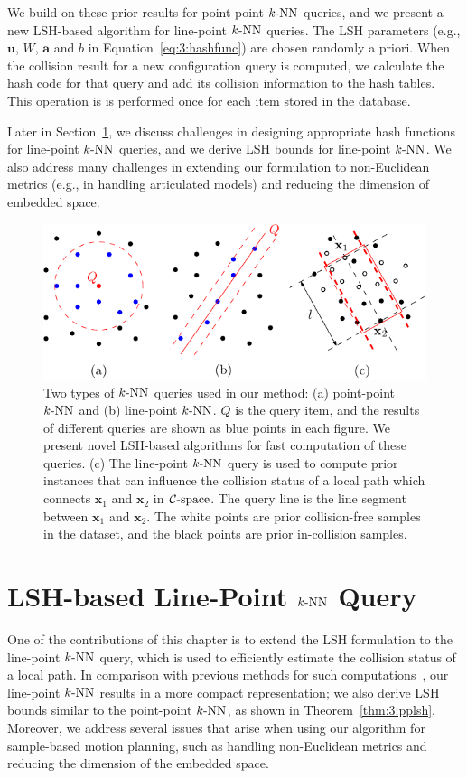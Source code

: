 We build on these prior results for point-point $\knn$ queries, and we present a new LSH-based algorithm for line-point $\knn$ queries. The LSH parameters (e.g., $\mathbf u$, $W$, $\mathbf a$ and $b$ in Equation~\ref{eq:3:hashfunc}) are chosen randomly a priori. When the collision result for a new configuration query is computed, we calculate the hash code for that query and add its collision information to the hash tables. This operation is is performed once for each item stored in the database.

Later in Section~\ref{sec:3:linelsh}, we discuss challenges in designing appropriate hash functions for line-point $\knn$ queries, and we derive LSH bounds for line-point $\knn$. We also address many challenges in extending our formulation to non-Euclidean metrics (e.g., in handling articulated models) and reducing the dimension of embedded space.

\begin{figure}[!h]
  \begin{center}
  \includegraphics[width=0.7\linewidth]{figs/3/KNN.pdf}
  \caption[Two types of $\knn$ queries used in instance-based learning]{Two types of $\knn$ queries used in our method: (a) point-point $\knn$ and (b) line-point $\knn$. $Q$ is the query item, and the results of different queries are shown as blue points in each figure. We present novel LSH-based algorithms for fast computation of these queries. (c) The line-point $\knn$ query is used to compute prior instances that can influence the collision status of a local path which connects $\mathbf x_1$ and $\mathbf x_2$ in $\mathcal C\text{-space}$. The query line is the line segment between $\mathbf x_1$ and $\mathbf x_2$. The white points are prior collision-free samples in the dataset, and the black points are prior in-collision samples.   \label{fig:3:KNN}}
\end{center}
\end{figure}





\section{LSH-based Line-Point $\knn$ Query}
\label{sec:3:linelsh}
One of the contributions of this chapter is to extend the LSH formulation to the line-point $\knn$ query, which is used to efficiently estimate the collision status of a local path. In comparison with previous methods for such computations~\cite{Andoni:2009:ALN,Basri:2011}, our line-point $\knn$ results in a more compact representation; we also derive LSH bounds similar to the point-point $\knn$, as shown in Theorem~\ref{thm:3:pplsh}. Moreover, we address several issues that arise when using our algorithm for sample-based motion planning, such as handling non-Euclidean metrics and reducing the dimension of the embedded space.

